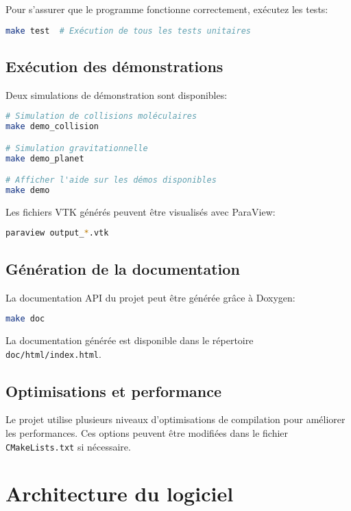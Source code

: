\documentclass[12pt,a4paper]{article}
\begin{document}
Pour s'assurer que le programme fonctionne correctement, exécutez les tests:

\begin{lstlisting}[language=bash]
make test  # Exécution de tous les tests unitaires
\end{lstlisting}

\subsection{Exécution des démonstrations}

Deux simulations de démonstration sont disponibles:

\begin{lstlisting}[language=bash]
# Simulation de collisions moléculaires
make demo_collision

# Simulation gravitationnelle
make demo_planet

# Afficher l'aide sur les démos disponibles
make demo
\end{lstlisting}

Les fichiers VTK générés peuvent être visualisés avec ParaView:

\begin{lstlisting}[language=bash]
paraview output_*.vtk
\end{lstlisting}

\subsection{Génération de la documentation}

La documentation API du projet peut être générée grâce à Doxygen:

\begin{lstlisting}[language=bash]
make doc
\end{lstlisting}

La documentation générée est disponible dans le répertoire \texttt{doc/html/index.html}.

\subsection{Optimisations et performance}

Le projet utilise plusieurs niveaux d'optimisations de compilation pour améliorer les performances. Ces options peuvent être modifiées dans le fichier \texttt{CMakeLists.txt} si nécessaire.

\section{Architecture du logiciel}
\end{document}
